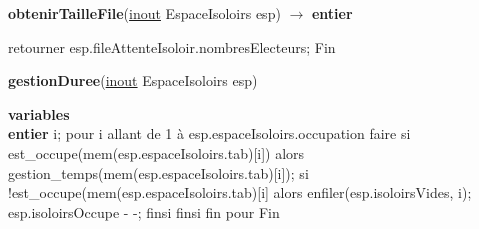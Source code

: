 \documentclass[12pt]{article} %
\begin{document}
\begin{algorithm}
	\caption{\textbf{obtenirTailleFile}(\underline{inout} EspaceIsoloirs esp) $\rightarrow$ \textbf{entier}}
	\begin{algorithmic}[1]
		\Start
		\State retourner esp.fileAttenteIsoloir.nombresElecteurs; 
		\State Fin
	\end{algorithmic}
\end{algorithm}

\newpage

\begin{algorithm}
	\caption{\textbf{gestionDuree}(\underline{inout} EspaceIsoloirs esp)}
	\begin{algorithmic}[1]
		\State \textbf{variables}\\ \textbf{entier} i;
		\Start
		\State pour i allant de 1 à esp.espaceIsoloirs.occupation faire
		\State  \hspace{\algorithmicindent} si est\_occupe(mem(esp.espaceIsoloirs.tab)[i]) alors
		\State  \hspace{\algorithmicindent} \hspace{\algorithmicindent} gestion\_temps(mem(esp.espaceIsoloirs.tab)[i]); 
		\State  \hspace{\algorithmicindent} \hspace{\algorithmicindent} \hspace{\algorithmicindent} si !est\_occupe(mem(esp.espaceIsoloirs.tab)[i] alors
		\State  \hspace{\algorithmicindent} \hspace{\algorithmicindent} \hspace{\algorithmicindent} \hspace{\algorithmicindent} enfiler(esp.isoloirsVides, i);
		\State  \hspace{\algorithmicindent} \hspace{\algorithmicindent} \hspace{\algorithmicindent} \hspace{\algorithmicindent} esp.isoloirsOccupe - -;
		\State  \hspace{\algorithmicindent} \hspace{\algorithmicindent} \hspace{\algorithmicindent} finsi
		\State  \hspace{\algorithmicindent} finsi
		\State fin pour
		\State Fin
	\end{algorithmic}
\end{algorithm}
\end{document}
